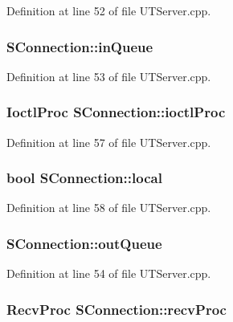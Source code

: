 Definition at line 52 of file UTServer.cpp.\hypertarget{struct_s_connection_774daaefa5b98373415ac366623f0455}{
\subsubsection[{inQueue}]{ {\bf SConnection::inQueue}}}
\label{struct_s_connection_774daaefa5b98373415ac366623f0455}




Definition at line 53 of file UTServer.cpp.\hypertarget{struct_s_connection_95a08a4899bcc4204174f9b80444d9c7}{
\subsubsection[{ioctlProc}]{\setlength{\rightskip}{0pt plus 5cm}IoctlProc {\bf SConnection::ioctlProc}}}
\label{struct_s_connection_95a08a4899bcc4204174f9b80444d9c7}




Definition at line 57 of file UTServer.cpp.\hypertarget{struct_s_connection_5d2664509b2124cbe67ce69805417f77}{
\subsubsection[{local}]{\setlength{\rightskip}{0pt plus 5cm}bool {\bf SConnection::local}}}
\label{struct_s_connection_5d2664509b2124cbe67ce69805417f77}




Definition at line 58 of file UTServer.cpp.\hypertarget{struct_s_connection_8cf19075e8f6360e990a7296e98da87b}{
\subsubsection[{outQueue}]{ {\bf SConnection::outQueue}}}
\label{struct_s_connection_8cf19075e8f6360e990a7296e98da87b}




Definition at line 54 of file UTServer.cpp.\hypertarget{struct_s_connection_c1813c487ad059d10a46f406e5bb8dab}{
\subsubsection[{recvProc}]{\setlength{\rightskip}{0pt plus 5cm}RecvProc {\bf SConnection::recvProc}}}
\label{struct_s_connection_c1813c487ad059d10a46f406e5bb8dab}




